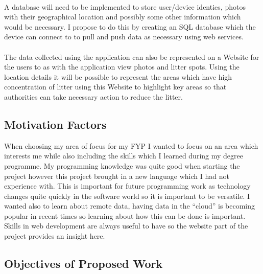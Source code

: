 \documentclass[12pt]{article}
\begin{document}
\paragraph{}


A database will need to be implemented to store user/device identies, photos with their geographical location and possibly some other information which would be necessary. I propose to do this by creating an SQL database which the device can connect to to pull and push data as necessary using web services.

\paragraph{}

The data collected using the application can also be represented on a Website for the users to as with the application view photos and litter spots. Using the location details it will be possible to represent the areas which have high concentration of litter using this Website to highlight key areas so that authorities can take necessary action to reduce the litter.

\newpage






\subsection{Motivation Factors}

When choosing my area of focus for my FYP I wanted to focus on an area which interests me while also including the skills which I learned during my degree programme. My programming knowledge was quite good when starting the project however this project brought in a new language which I had not experience with. This is important for future programming work as technology changes quite quickly in the software world so it is important to be versatile.
I wanted also to learn about remote data, having data in the “cloud” is becoming popular in recent times so learning about how this can be done is important. 
Skills in web development are always useful to have so the website part of the project provides an insight here.



\subsection{Objectives of Proposed Work}
\end{document}
